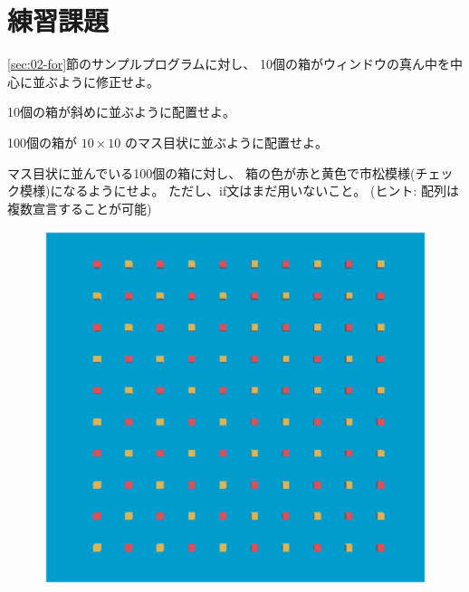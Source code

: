 \section{練習課題} \label{sec:02-q}
\begin{description}
 \myitem \ref{sec:02-for}節のサンプルプログラムに対し、
	10個の箱がウィンドウの真ん中を中心に並ぶように修正せよ。

 \myitem 10個の箱が斜めに並ぶように配置せよ。

 \myitem 100個の箱が \(10\times10\) のマス目状に並ぶように配置せよ。

 \myitem マス目状に並んでいる100個の箱に対し、
	箱の色が赤と黄色で市松模様(チェック模様)になるようにせよ。
	ただし、if文はまだ用いないこと。
	(ヒント: 配列は複数宣言することが可能)
\end{description}
\begin{figure}[H]
\centering
\includegraphics[scale=0.4]{./Fig/Fig02-01.eps}
\end{figure}
